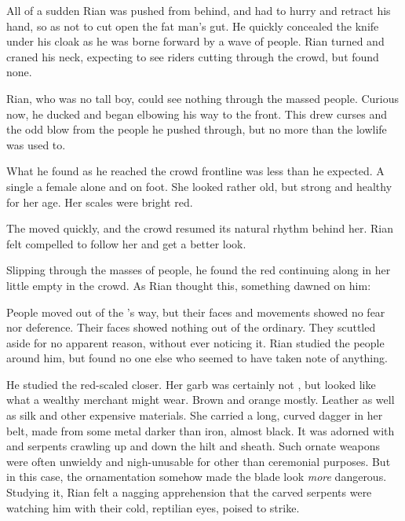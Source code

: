 All of a sudden Rian was pushed from behind, and had to hurry and retract his hand, so as not to cut open the fat man's gut. He quickly concealed the knife under his cloak as he was borne forward by a wave of people. Rian turned and craned his neck, expecting to see riders cutting through the crowd, but found none. 


Rian, who was no tall boy,  
could see nothing through the massed people. Curious now, he ducked and began elbowing his way to the front. This drew curses and the odd blow from the people he pushed through, but no more than the lowlife was used to. 

What he found as he reached the crowd frontline was less than he expected.
A single \sphyle{}\dash a female \scatha{}\dash alone and on foot.
She looked rather old, but strong and healthy for her age. 
Her scales were bright red. 


The \sphyle moved quickly, and the crowd resumed its natural rhythm behind her. 
Rian felt compelled to follow her and get a better look. 

Slipping through the masses of people, he found the red \sphyle continuing along in her little empty  in the crowd. 
As Rian thought this, something dawned on him: 


People moved out of the \traveler's way, but their faces and movements showed no fear nor deference. 
Their faces showed nothing out of the ordinary. 
They scuttled aside for no apparent reason, without ever noticing it. 
Rian studied the people around him, but found no one else who seemed to have taken note of anything.


He studied the red-scaled \sphyle closer. 
Her garb was certainly not \Malcuric, but looked like what a wealthy \travelling merchant might wear. Brown and orange \colours mostly. Leather as well as silk and other expensive materials. 
She carried a long, curved dagger in her belt, made from some metal darker than iron, almost black. 
It was adorned with \dragons{} and serpents crawling up and down the hilt and sheath. 
Such ornate weapons were often unwieldy and nigh-unusable for other than ceremonial purposes. But in this case, the ornamentation somehow made the blade look \emph{more} dangerous. 
Studying it, Rian felt a nagging apprehension that the carved serpents were watching him with their cold, reptilian eyes, poised to strike. 


